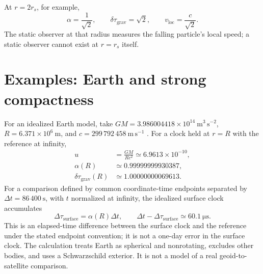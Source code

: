 \documentclass[12pt]{article}
\begin{document}
At $r=2r_s$, for example,
\begin{equation}
  \alpha=\frac{1}{\sqrt{2}},
  \qquad \delta\tau_{\mathrm{grav}}=\sqrt{2},
  \qquad v_{\mathrm{loc}}=\frac{c}{\sqrt{2}}.
  \label{eq:two-rs-example}
\end{equation}
The static observer at that radius measures the falling particle's local speed; a static observer cannot exist at $r=r_s$ itself.

\section{Examples: Earth and strong compactness}

For an idealized Earth model, take $GM=3.986004418\times10^{14}\ \mathrm{m^3\,s^{-2}}$, $R=6.371\times10^6\ \mathrm{m}$, and $c=299\,792\,458\ \mathrm{m\,s^{-1}}$ \cite{IERS}. For a clock held at $r=R$ with the reference at infinity,
\begin{equation}
  \begin{aligned}
    u&=\frac{GM}{Rc^2}\simeq6.9613\times10^{-10},\\
    \alpha(R)&\simeq0.99999999930387,\\
    \delta\tau_{\mathrm{grav}}(R)&\simeq1.00000000069613.
  \end{aligned}
  \label{eq:earth-values}
\end{equation}
For a comparison defined by common coordinate-time endpoints separated by $\Delta t=86\,400\ \mathrm{s}$, with $t$ normalized at infinity, the idealized surface clock accumulates
\begin{equation}
  \Delta\tau_{\mathrm{surface}}=\alpha(R)\Delta t,
  \qquad
  \Delta t-\Delta\tau_{\mathrm{surface}}\simeq60.1\ \mathrm{\mu s}.
  \label{eq:earth-day}
\end{equation}
This is an elapsed-time difference between the surface clock and the reference under the stated endpoint convention; it is not a one-day error in the surface clock. The calculation treats Earth as spherical and nonrotating, excludes other bodies, and uses a Schwarzschild exterior. It is not a model of a real geoid-to-satellite comparison.
\end{document}
